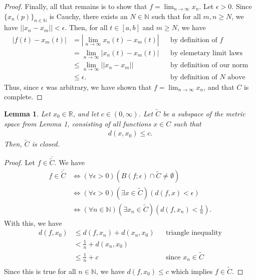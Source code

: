 \documentclass[10pt,a4paper]{article}
\theoremstyle{theorem}
\newtheorem{lemma}{Lemma}
\theoremstyle{definition}
\begin{document}
\begin{proof}
Finally, all that remains is to show that $f = \lim_{n \to \infty} x_n$. Let $\epsilon >0$. Since $\{x_n(p)\}_{n \in \mathbb{N}}$ is Cauchy, there exists an $N \in \mathbb{N}$ such that for all $m, n \geq N$, we have $||x_n - x_m|| < \epsilon$. Then, for all $t \in [a, b]$ and $m \geq N$, we have
\begin{align*}
|f(t) - x_m(t)| &= |\lim_{n \to \infty} x_n(t) - x_m(t)| && \text{by definition of } f\\
&= \lim_{n \to \infty}|x_n(t) - x_m(t)| && \text{by elemetary limit laws}\\
&\leq \lim_{n \to \infty}||x_n - x_m|| && \text{by definition of our norm}\\
&\leq \epsilon. && \text{by definition of } N \text{ above}
\end{align*}
Thus, since $\epsilon$ was arbitrary, we have shown that $f = \lim_{n \to \infty} x_n$, and that $C$ is complete.
\end{proof}

\begin{lemma}
Let $x_0 \in \mathbb{R}$, and let $c \in (0, \infty)$. Let $\tilde{C}$ be a subspace of the metric space from Lemma 1, consisting of all functions $x \in C$ such that 
\begin{align*}
d(x, x_0) \leq c.
\end{align*}
Then, $\tilde{C}$ is closed.
\end{lemma}

\begin{proof}
Let $f \in \bar{\tilde{C}}$.  We have
\begin{align*}
f \in \bar{\tilde{C}} &\iff (\forall \epsilon > 0)(B(f; \epsilon) \cap \tilde{C} \not = \emptyset)\\
&\iff (\forall \epsilon > 0)(\exists x \in \tilde{C})(d(f, x) < \epsilon)\\
&\iff (\forall n \in \mathbb{N})(\exists x_n \in \tilde{C})(d(f, x_n) < \frac{1}{n}).
\end{align*}
With this, we have
\begin{align*}
d(f, x_0) &\leq d(f, x_n) + d(x_n, x_0) && \text{triangle inequality}\\
&< \frac{1}{n} + d(x_n, x_0)\\
&\leq \frac{1}{n} + c && \text{since } x_n \in \tilde{C}\\
\end{align*}
Since this is true for all $n \in \mathbb{N}$, we have $d(f, x_0) \leq c$ which implies $f \in \tilde{C}$.
\end{proof}
\end{document}
